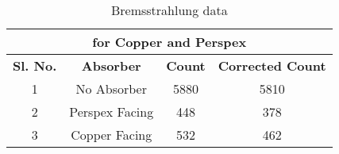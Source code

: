 \begin{table}[H]
{\begin{tabular}{cccc}
			\multicolumn{4}{|c|}{\textbf{for Copper and   Perspex}}                                                                                                               \\ \hline
			\multicolumn{1}{|c|}{\textbf{Sl. No.}} & \multicolumn{1}{c|}{\textbf{Absorber}} & \multicolumn{1}{c|}{\textbf{Count}} & \multicolumn{1}{c|}{\textbf{Corrected Count}} \\ \hline
			\multicolumn{1}{|c|}{1}                & \multicolumn{1}{c|}{No Absorber}       & \multicolumn{1}{c|}{5880}           & \multicolumn{1}{c|}{5810}                     \\ \hline
			\multicolumn{1}{|c|}{2}                & \multicolumn{1}{c|}{Perspex Facing}    & \multicolumn{1}{c|}{448}            & \multicolumn{1}{c|}{378}                      \\ \hline
			\multicolumn{1}{|c|}{3}                & \multicolumn{1}{c|}{Copper Facing}     & \multicolumn{1}{c|}{532}            & \multicolumn{1}{c|}{462}                      \\ \hline
		\end{tabular}%
	}
	\caption{Bremsstrahlung data}
	\label{tab:5}
\end{table}